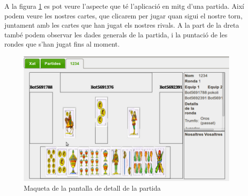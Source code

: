 A la figura \ref{fig:real-partida} es pot veure l'aspecte que té l'aplicació en mitg d'una partida. Així podem veure les nostres cartes, que clicarem per jugar quan sigui el nostre torn, juntament amb les cartes que han jugat els nostres rivals. A la part de la dreta també podem observar les dades generals de la partida, i la puntació de les rondes que s'han jugat fins al moment. 
\begin{figure}[htbp]
\centering\includegraphics{img/real-partida.png}
\caption{Maqueta de la pantalla de detall de la partida}
\label{fig:real-partida}
\end{figure} 

